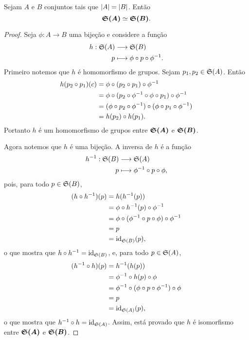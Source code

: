 \begin{prop}
	Sejam $A$ e $B$ conjuntos tais que $\left\vert{A}\right\vert = \left\vert{B}\right\vert$. Então
	\begin{equation*}
	\bm{\mathfrak{S}(A)} \simeq \bm{\mathfrak{S}(B)}.
	\end{equation*}
\end{prop}
\begin{proof}
	Seja $\phi: A \to B$ uma bijeção e considere a função
	\begin{align*}
	{h}: {\mathfrak{S}(A)} &\longrightarrow {\mathfrak{S}(B)} \\{p} &\longmapsto {\phi \circ p \circ \phi^{-1}}.
	\end{align*}
Primeiro notemos que $h$ é homomorfismo de grupos. Sejam $p_1,p_2 \in \mathfrak{S}(A)$. Então
	\begin{align*}
	h(p_2 \circ p_1)(c) &= \phi \circ (p_2 \circ p_1) \circ \phi^{-1} \\
			&= \phi \circ (p_2 \circ \phi^{-1} \circ \phi \circ p_1) \circ \phi^{-1} \\
			&= (\phi \circ p_2 \circ \phi^{-1}) \circ (\phi \circ p_1 \circ \phi^{-1}) \\
			&= h(p_2) \circ h(p_1).
	\end{align*}
Portanto $h$ é um homomorfismo de grupos entre $\bm{\mathfrak{S}(A)}$ e $\bm{\mathfrak{S}(B)}$.

Agora notemos que $h$ é uma bijeção. A inversa de $h$ é a função
	\begin{align*}
	{h^{-1}}: {\mathfrak{S}(B)} &\longrightarrow {\mathfrak{S}(A)} \\{p} &\longmapsto {\phi^{-1}\circ p \circ \phi},
	\end{align*}
pois, para todo $p \in \mathfrak{S}(B)$,
	\begin{align*}
	(h \circ h^{-1}) (p) &= h (h^{-1}(p)) \\
			&= \phi \circ h^{-1}(p) \circ \phi^{-1} \\
			&= \phi \circ (\phi^{-1} \circ p \circ \phi) \circ \phi^{-1} \\
			&= p \\
			&= \mathrm{id}_{\mathfrak{S}(B)}(p),
	\end{align*}
o que mostra que $h \circ h^{-1} = \mathrm{id}_{\mathfrak{S}(B)}$, e, para todo $p \in \mathfrak{S}(A)$,
	\begin{align*}
	(h^{-1} \circ h) (p) &= h^{-1} (h(p)) \\
			&= \phi^{-1} \circ h(p) \circ \phi \\
			&= \phi^{-1} \circ (\phi \circ p \circ \phi^{-1}) \circ \phi \\
			&= p \\
			&= \mathrm{id}_{\mathfrak{S}(A)}(p),
	\end{align*}
o que mostra que $h^{-1} \circ h = \mathrm{id}_{\mathfrak{S}(A)}$. Assim, está provado que $h$ é isomorfismo entre $\bm{\mathfrak{S}(A)}$ e $\bm{\mathfrak{S}(B)}$.
\end{proof}

